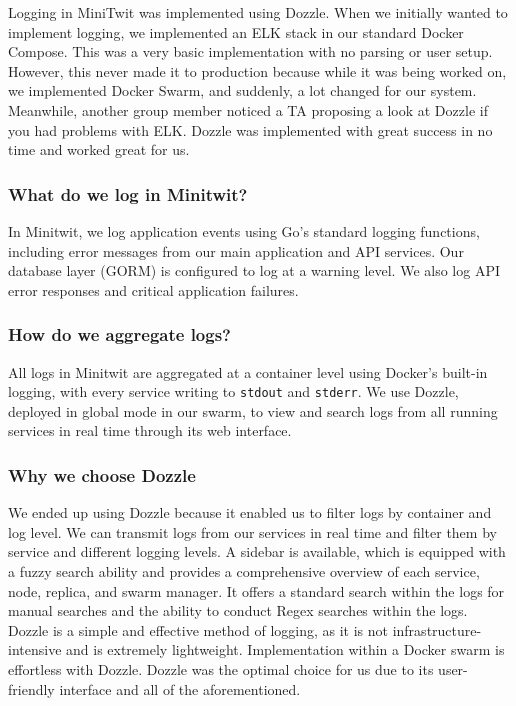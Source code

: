 Logging in MiniTwit was implemented using Dozzle. When we initially wanted to implement logging, we implemented an ELK stack in our standard Docker Compose. This was a very basic implementation with no parsing or user setup. However, this never made it to production because while it was being worked on, we implemented Docker Swarm, and suddenly, a lot changed for our system. Meanwhile, another group member noticed a TA proposing a look at Dozzle if you had problems with ELK. Dozzle was implemented with great success in no time and worked great for us.

\subsubsection*{What do we log in Minitwit?}
In Minitwit, we log application events using Go's standard logging functions, including error messages from our main application and API services. Our database layer (GORM) is configured to log at a warning level. We also log API error responses and critical application failures.

\subsubsection*{How do we aggregate logs?}
All logs in Minitwit are aggregated at a container level using Docker’s built-in logging, with every service writing to \texttt{stdout} and \texttt{stderr}. We use Dozzle, deployed in global mode in our swarm, to view and search logs from all running services in real time through its web interface. 

\subsubsection*{Why we choose Dozzle}
We ended up using Dozzle because it enabled us to filter logs by container and log level. We can transmit logs from our services in real time and filter them by service and different logging levels. A sidebar is available, which is equipped with a fuzzy search ability and provides a comprehensive overview of each service, node, replica, and swarm manager. It offers a standard search within the logs for manual searches and the ability to conduct Regex searches within the logs. Dozzle is a simple and effective method of logging, as it is not infrastructure-intensive and is extremely lightweight. Implementation within a Docker swarm is effortless with Dozzle. Dozzle was the optimal choice for us due to its user-friendly interface and all of the aforementioned.

